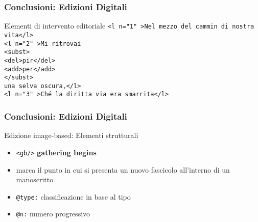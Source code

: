 \begin{frame}
    \frametitle{Conclusioni: Edizioni Digitali}
    \addtocounter{nframe}{1}
    

    \begin{block}{Elementi di intervento editoriale}
        \texttt{<l n="1" >Nel mezzo del cammin di nostra vita</l> }
        \\\texttt{<l n="2" >Mi ritrovai }
        \\\texttt{<subst>}
        \\\texttt{<del>pir</del>}
        \\\texttt{<add>per</add>}
        \\\texttt{</subst>}
        \\\texttt{una selva oscura,</l>}
        \\\texttt{<l n="3" >Ché la diritta via era smarrita</l>}
    \end{block}
    
\end{frame}



\begin{frame}
    \frametitle{Conclusioni: Edizioni Digitali}
    \addtocounter{nframe}{1}
    

    \begin{block}{Edizione image-based: Elementi strutturali}
        \begin{itemize}
            \item \texttt{<gb/>} \textbf{gathering begins} 
            \item[] marca il punto in cui si presenta un nuovo fascicolo all’interno di un manoscritto
            \item \texttt{@type:} classificazione in base al tipo
            \item \texttt{@n:} numero progressivo
        \end{itemize}
    \end{block}
\end{frame}

